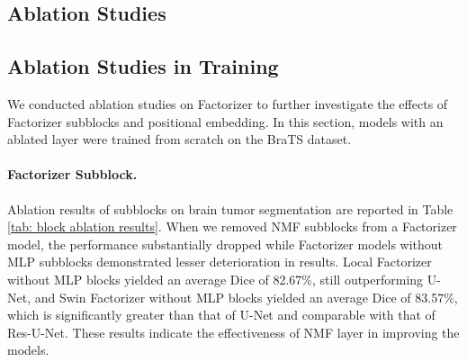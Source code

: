 \documentclass[a4,12pt]{article}
\begin{document}
	
	\subsection{Ablation Studies}  \label{sec: ablation studies}
	
	
	\subsection{Ablation Studies in Training}  \label{sec: training ablation studies}
	We conducted ablation studies on Factorizer to further investigate the effects of Factorizer subblocks and positional embedding. In this section, models with an ablated layer were trained from scratch on the BraTS dataset.
	
	\paragraph{Factorizer Subblock.} 
	Ablation results of subblocks on brain tumor segmentation are reported in Table \ref{tab: block ablation results}. When we removed NMF subblocks from a Factorizer model, the performance substantially dropped while Factorizer models without MLP subblocks demonstrated lesser deterioration in results. Local Factorizer without MLP blocks yielded an average Dice of 82.67\%, still outperforming U-Net, and Swin Factorizer without MLP blocks yielded an average Dice of 83.57\%, which is significantly greater than that of U-Net and comparable with that of Res-U-Net. These results indicate the effectiveness of NMF layer in improving the models.    
	
\end{document}
